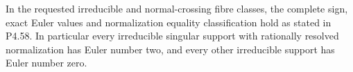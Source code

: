 
\begin{proposition}[P4.9]\hypertarget{tag-02Y1}{}\label{night:P4.9}\label{stmt:P4.9}


In the requested irreducible and normal-crossing fibre classes,
the complete sign, exact Euler values and normalization equality
classification hold as stated in P4.58. In particular every
irreducible singular support with rationally resolved normalization
has Euler number two, and every other irreducible support has
Euler number zero.
\end{proposition}

